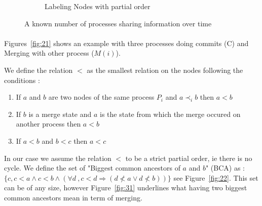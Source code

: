 \begin{figure}[H]
\begin{subfigure}[b]{0.3\textwidth}
{
 }
 \caption{Labeling Nodes with partial order}  \label{fig:23}
\end{subfigure}
\caption{A known number of processes sharing information over time}
\end{figure}

\paragraph{} Figures~\ref{fig:21} shows an example with three processes doing commits (C) and Merging with other process ($M(i)$). 
\begin{definition} We define the relation $<$ as the smallest relation on the nodes following the conditions :
 \begin{enumerate}
  \item If $a$ and $b$ are two nodes of the same process $P_i$ and $a \prec_i b$ then $a < b$
  \item If $b$ is a merge state and $a$ is the state from which the merge occured on another process then $a<b$
  \item If $a< b$ and $b<c$ then $a<c$ 
 \end{enumerate}
\end{definition}
In our case we assume the relation $<$ to be a strict partial order, ie there is no cycle. We define the set of "Biggest common ancestors of $a$ and $b$" (BCA) as : $\{c, 
c < a 
\wedge 
c < b 
\wedge 
\left ( 
\forall d\ ,
c < d \Rightarrow \left ( d \nless a \vee d \nless b \right )
\right )
\}$ see Figure~\ref{fig:22}. This set can be of any size, however Figure~\ref{fig:31} underlines what having two biggest common ancestors mean in term of merging. 
